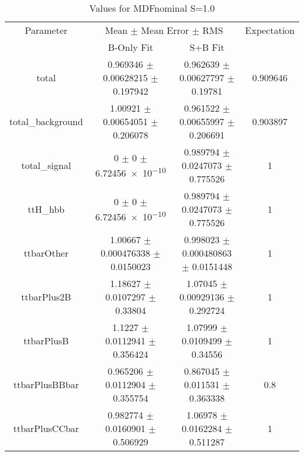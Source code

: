 \begin{table}
\centering
\caption{Values for MDFnominal S=1.0}
\begin{tabular}{cccc}
\toprule
Parameter & \multicolumn{2}{c}{Mean $\pm$ Mean Error $\pm$ RMS} & Expectation\\
 & B-Only Fit & S+B Fit & \\
\midrule
total & \num{0.969346} $\pm$ \num{0.00628215} $\pm$ \num{0.197942} & \num{0.962639} $\pm$ \num{0.00627797} $\pm$ \num{0.19781} & \num{0.909646}\\
total\_background & \num{1.00921} $\pm$ \num{0.00654051} $\pm$ \num{0.206078} & \num{0.961522} $\pm$ \num{0.00655997} $\pm$ \num{0.206691} & \num{0.903897}\\
total\_signal & \num{0} $\pm$ \num{0} $\pm$ \num{6.72456e-10} & \num{0.989794} $\pm$ \num{0.0247073} $\pm$ \num{0.775526} & \num{1}\\
ttH\_hbb & \num{0} $\pm$ \num{0} $\pm$ \num{6.72456e-10} & \num{0.989794} $\pm$ \num{0.0247073} $\pm$ \num{0.775526} & \num{1}\\
ttbarOther & \num{1.00667} $\pm$ \num{0.000476338} $\pm$ \num{0.0150023} & \num{0.998023} $\pm$ \num{0.000480863} $\pm$ \num{0.0151448} & \num{1}\\
ttbarPlus2B & \num{1.18627} $\pm$ \num{0.0107297} $\pm$ \num{0.33804} & \num{1.07045} $\pm$ \num{0.00929136} $\pm$ \num{0.292724} & \num{1}\\
ttbarPlusB & \num{1.1227} $\pm$ \num{0.0112941} $\pm$ \num{0.356424} & \num{1.07999} $\pm$ \num{0.0109499} $\pm$ \num{0.34556} & \num{1}\\
ttbarPlusBBbar & \num{0.965206} $\pm$ \num{0.0112904} $\pm$ \num{0.355754} & \num{0.867045} $\pm$ \num{0.011531} $\pm$ \num{0.363338} & \num{0.8}\\
ttbarPlusCCbar & \num{0.982774} $\pm$ \num{0.0160901} $\pm$ \num{0.506929} & \num{1.06978} $\pm$ \num{0.0162284} $\pm$ \num{0.511287} & \num{1}\\
\bottomrule
\end{tabular}
\end{table}